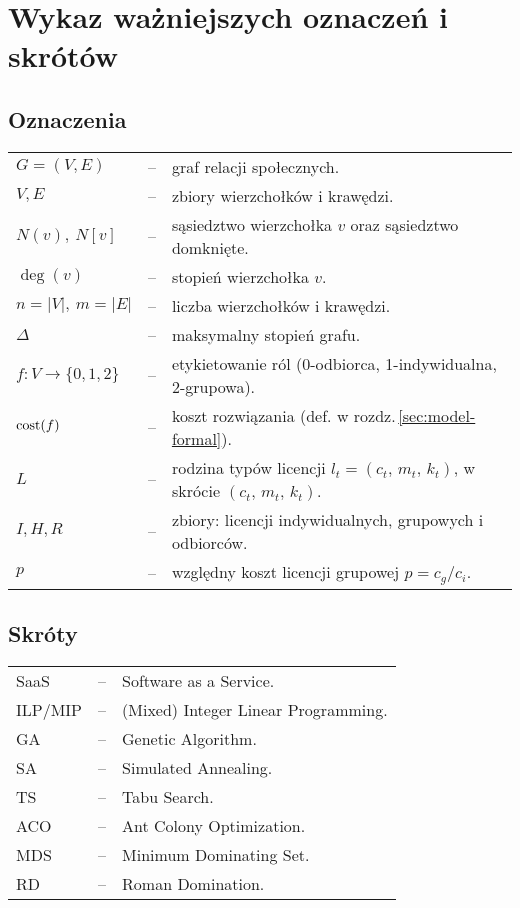 \chapter*{Wykaz ważniejszych oznaczeń i skrótów}

\section*{Oznaczenia}

\begin{tabular}{@{} l l p{} @{}}
    $G=(V,E)$    & -- & graf relacji społecznych. \\
    $V,E$        & -- & zbiory wierzchołków i krawędzi. \\
    $N(v),\ N[v]$ & -- & sąsiedztwo wierzchołka $v$ oraz sąsiedztwo domknięte. \\
    $\deg(v)$    & -- & stopień wierzchołka $v$. \\
    $n=|V|,\ m=|E|$ & -- & liczba wierzchołków i krawędzi. \\
    $\Delta$     & -- & maksymalny stopień grafu. \\
    $f:V\to\{0,1,2\}$ & -- & etykietowanie ról (0-odbiorca, 1-indywidualna, 2-grupowa). \\
    $\operatorname{cost}(f)$   & -- & koszt rozwiązania (def. w rozdz.\,\ref{sec:model-formal}). \\
    $L$ & -- & rodzina typów licencji $l_t=(c_t,\,m_t,\,k_t)$, w skrócie $(c_t,\,m_t,\,k_t)$. \\
    $I,H,R$      & -- & zbiory: licencji indywidualnych, grupowych i odbiorców. \\
    $p$          & -- & względny koszt licencji grupowej $p=c_g/c_i$. \\
\end{tabular}

\section*{Skróty}

\begin{tabular}{@{} l l p{} @{}}
    SaaS & -- & Software as a Service. \\
    ILP/MIP & -- & (Mixed) Integer Linear Programming. \\
    GA   & -- & Genetic Algorithm. \\
    SA   & -- & Simulated Annealing. \\
    TS   & -- & Tabu Search. \\
    ACO  & -- & Ant Colony Optimization. \\
    MDS  & -- & Minimum Dominating Set. \\
    RD   & -- & Roman Domination. \\
\end{tabular}
